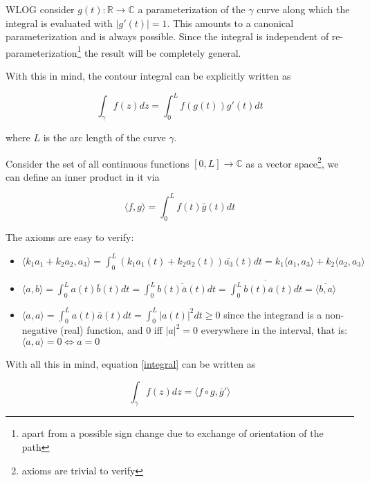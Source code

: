 \documentclass[12pt]{article}
\begin{document}
WLOG consider $g(t):\mathbb{R} \to \mathbb{C}$ a parameterization of the $\gamma$ curve along which the integral is evaluated with $|g'(t)|=1$. This amounts to a canonical parameterization and is always possible.
Since the integral is independent of re-parameterization\footnote{apart from a possible sign change due to exchange of orientation of the path} the result will be completely general.

With this in mind, the contour integral can be explicitly written as

\begin{equation}
\label{integral}
\int_\gamma f(z) dz = \int_0^L f(g(t)) g'(t) dt
\end{equation}

where $L$ is the arc length of the curve $\gamma$.

Consider the set of all continuous functions $[0,L]\to \mathbb{C}$ as a vector space\footnote{axioms are trivial to verify}, we can define an inner product in it via

\begin{equation}
\langle f,g\rangle = \int_0^L f(t)\bar{g}(t) dt
\end{equation}

The axioms are easy to verify:

\begin{itemize}
\item $\langle k_1 a_1+k_2 a_2,a_3\rangle = \int_0^L (k_1 a_1(t) + k_2 a_2(t))\bar{a_3}(t) dt = k_1\langle a_1,a_3 \rangle +k_2\langle a_2,a_3 \rangle$

\item $\langle a,b \rangle = \int_0^L a(t)\bar{b}(t) dt = \int_0^L \overline{b(t)\bar{a}(t)}dt = \overline{\int_0^L b(t)\bar{a}(t) dt} = \overline{\langle b,a \rangle}$

\item $\langle a,a \rangle = \int_0^L a(t)\bar{a}(t) dt = \int_0^L |a(t)|^2 dt \ge 0$ since the integrand is a non-negative (real) function, and $0$ iff $|a|^2=0$ everywhere in the interval, that is: $\langle a,a \rangle=0 \iff a=0$

\end{itemize}

With all this in mind, equation \ref{integral} can be written as

\begin{equation}
\int_\gamma f(z) dz = \langle f\circ g, \bar{g}' \rangle
\end{equation}
\end{document}
